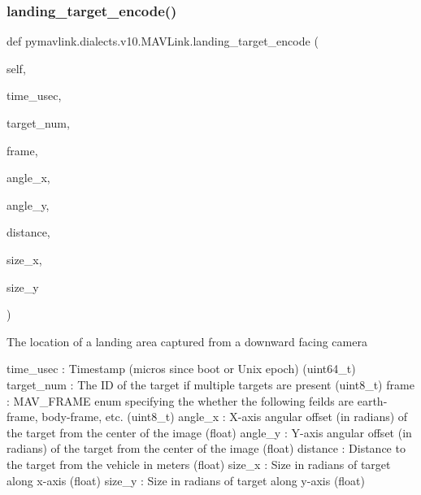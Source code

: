 \begin{DoxyVerb}
\begin{DoxyVerb}
\begin{DoxyVerb}
\begin{DoxyVerb}
\subsubsection{\texorpdfstring{landing\+\_\+target\+\_\+encode()}{landing\_target\_encode()}}
{\footnotesize\ttfamily def pymavlink.\+dialects.\+v10.\+M\+A\+V\+Link.\+landing\+\_\+target\+\_\+encode (\begin{DoxyParamCaption}\item[{}]{self,  }\item[{}]{time\+\_\+usec,  }\item[{}]{target\+\_\+num,  }\item[{}]{frame,  }\item[{}]{angle\+\_\+x,  }\item[{}]{angle\+\_\+y,  }\item[{}]{distance,  }\item[{}]{size\+\_\+x,  }\item[{}]{size\+\_\+y }\end{DoxyParamCaption})}

\begin{DoxyVerb}The location of a landing area captured from a downward facing camera

time_usec                 : Timestamp (micros since boot or Unix epoch) (uint64_t)
target_num                : The ID of the target if multiple targets are present (uint8_t)
frame                     : MAV_FRAME enum specifying the whether the following feilds are earth-frame, body-frame, etc. (uint8_t)
angle_x                   : X-axis angular offset (in radians) of the target from the center of the image (float)
angle_y                   : Y-axis angular offset (in radians) of the target from the center of the image (float)
distance                  : Distance to the target from the vehicle in meters (float)
size_x                    : Size in radians of target along x-axis (float)
size_y                    : Size in radians of target along y-axis (float)\end{DoxyVerb}
 \mbox{\label{classpymavlink_1_1dialects_1_1v10_1_1MAVLink_ab93f9fa81a13bf2a8fba16e7dd4dbad4}} 

\end{DoxyVerb}
\end{DoxyVerb}
\end{DoxyVerb}
\end{DoxyVerb}
